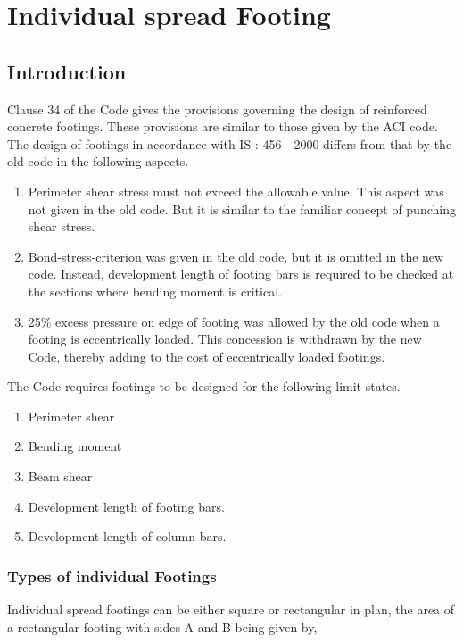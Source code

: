 \documentclass{book}
\begin{document}
\chapter{Individual spread Footing}
\section{Introduction}

Clause 34 of the Code gives the provisions governing the design of reinforced concrete footings. These provisions are similar to those given by the ACI code. The design of footings in accordance with IS : 456—2000 differs from that by the old code in the following aspects.

\begin{enumerate}
\item Perimeter shear stress must not exceed the allowable value. This aspect was not
given in the old code. But it is similar to the familiar concept of punching shear
stress.

\item Bond-stress-criterion was given in the old code, but it is omitted in the new code.
Instead, development length of footing bars is required to be checked at the sections
where bending moment is critical.

\item 25\% excess pressure on edge of footing was allowed by the old code when a footing
 is eccentrically loaded. This concession is withdrawn by the new Code, thereby
adding to the cost of eccentrically loaded footings.

\end{enumerate}
The Code requires footings to be designed for the following limit states.

\begin{enumerate}
\item Perimeter shear
\item Bending moment
\item Beam shear
\item  Development length of footing bars.
\item Development length of column bars.
\end{enumerate}

\subsection{Types of individual Footings}
Individual spread footings can be either square or rectangular in plan, the area of a rectangular footing with sides A and B being given by,
\end{document}
